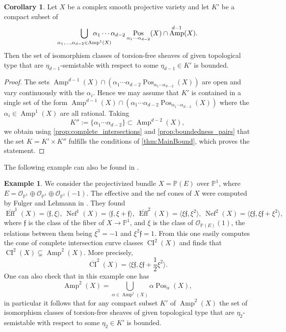 \documentclass[a4,reqno]{amsart}
\theoremstyle{definition}
\newtheorem{corollary}[theorem]{Corollary}
\newtheorem{example}[theorem]{Example}
\def\cO{\mathcal O}
\def\gf{{\mathfrak f}}
\renewcommand{\P}{\mathbb{P}}
\DeclareMathOperator{\Amp}{Amp}
\DeclareMathOperator{\Eff}{Eff}
\DeclareMathOperator{\Pos}{Pos}
\DeclareMathOperator{\Nef}{Nef}
\DeclareMathOperator{\CI}{CI}
\numberwithin{equation}{section}
\begin{document}
\begin{corollary}\label{cor:CIboundedness}
    Let $X$ be a complex smooth projective variety and let $K'$ be a compact subset of 
     $$\bigcup_{\alpha_1,\ldots,\alpha_{d-2}\in\Amp^1(X)} \hspace{-1cm} \alpha_1\cdots\alpha_{d-2}\Pos_{\alpha_1 \cdots \alpha_{d-2}}(X) \cap \Amp^{d-1}(X).$$ 
Then the set of isomorphism classes of torsion-free sheaves of given topological type that are $\eta_{d-1}$-semistable with respect to some $\eta_{d-1}\in K'$ is bounded.
\end{corollary}
\begin{proof}
The sets $\Amp^{d-1}(X)\cap(\alpha_1 \cdots \alpha_{d-2}\Pos_{\alpha_1 \cdots \alpha_{d-2}}(X))$ are open and vary continuously with the $\alpha_i$.   Hence we may assume that $K'$ is contained in a single set of the form $\Amp^{d-1}(X)\cap(\alpha_1 \cdots \alpha_{d-2}\Pos_{\alpha_1 \cdots \alpha_{d-2}}(X))$ where the $\alpha_i\in \Amp^1(X)$ are all rational. Taking
\[
    K'' := \{ \alpha_1 \cdots \alpha_{d-2} \} \subset \Amp^{d-2}(X),
\]
we obtain using \cref{prop:complete_intersections} and \cref{prop:boundedness_pairs} that the set $K = K' \times K''$ fulfills the conditions of \cref{thm:MainBound}, which proves the statement.
\end{proof}

The following example can also be found in \cite{MegyPavelToma}.

\begin{example}
    We consider the projectivized bundle $X=\P(E)$ over $\P^1$, where $E=\cO_{\P^1}\oplus \cO_{\P^1}\oplus\cO_{\P^1}(-1)$. The effective and the nef cones of $X$ were computed by Fulger and Lehmann in \cite[Example 3.11]{FulgerLehmann2017cones}. They found 
    $$ \overline{\Eff}^1(X) =  \langle\gf,\xi \rangle, \ \Nef^1(X) =  \langle\gf,\xi+ \gf \rangle, \
\overline{\Eff}^2(X) =  \langle\xi\gf,\xi^2 \rangle
, \ \Nef^2(X) =  \langle\xi\gf, \xi\gf+\xi^2  \rangle,$$
where $\gf$ is the class of the fiber of $X\to\P^1$, and $\xi$ is the class of $\cO_{\P(E)}(1)$, the relations between them being $\xi^3=-1$ and $\xi^2\gf=1$. 
From this one easily computes the cone of complete intersection curve classes $\CI^2(X)$ and finds that $\CI^2(X)\varsubsetneq\Amp^2(X)$. More precisely, 
$$ \overline{\CI}^2(X)=\langle\xi\gf,\xi\gf+\frac{1}{2}\xi^2\rangle.$$ 
One can also check that in this example one has 
$$ \Amp^2(X)=\bigcup_{\alpha\in\Amp^1(X)}\alpha\Pos_\alpha(X),$$
in particular it follows that for any compact subset $K'$ of $\Amp^2(X)$ the set of isomorphism classes of torsion-free sheaves of given topological type that are $\eta_{2}$-semistable with respect to some $\eta_{2}\in K'$ is bounded.
\end{example}
\end{document}
